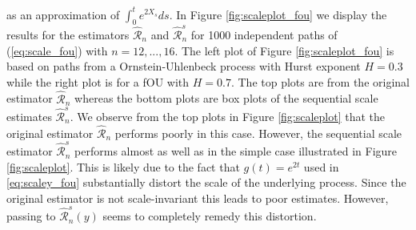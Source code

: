 \documentclass{article}
\begin{document}
as an approximation of $\int_0^t e^{2X_s} ds$. In Figure \ref{fig:scaleplot_fou} we display the results for the estimators $\hat{\mathscr{R}}_n$ and $\hat{\mathscr{R}}_n^s$ for 1000 independent paths of (\ref{eq:scale_fou}) with $n = 12,...,16$. The left plot of Figure \ref{fig:scaleplot_fou} is based on paths from a Ornstein-Uhlenbeck process with Hurst exponent $H=0.3$ while the right plot is for a fOU with $H=0.7$. The top plots are from the original estimator $\hat{\mathscr{R}}_n$ whereas the bottom plots are box plots of the sequential scale estimates $\hat{\mathscr{R}}_n^s$. We observe from the top plots in Figure \ref{fig:scaleplot} that the original estimator $\hat{\mathscr{R}}_n$ performs poorly in this case. However, the sequential scale estimator $\hat{\mathscr{R}}_n^s$ performs almost as well as in the simple case illustrated in Figure \ref{fig:scaleplot}. This is likely due to the fact that $g(t)=e^{2t}$ used in \eqref{eq:scaley_fou} substantially distort the scale of the underlying process. Since the original estimator is not scale-invariant this leads to poor estimates. However, passing to $\hat{\mathscr{R}}_n^s (y)$ seems to completely remedy this distortion. 
\end{document}
